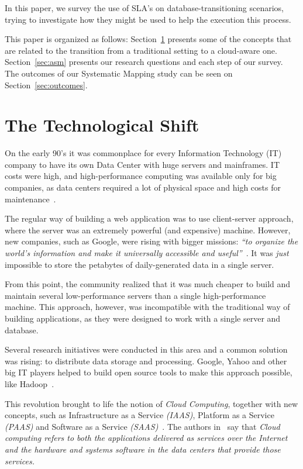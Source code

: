 \documentclass{article}
\begin{document}
In this paper, we survey the use of SLA's on database-transitioning scenarios, trying to investigate how they might be used to help the execution this process.
\bigskip

This paper is organized as follows: 
Section~\ref{sec:tts} presents some of the concepts that are related to the transition from a traditional setting to a cloud-aware one.
Section~\ref{sec:asm} presents our research questions and each step of our survey. The outcomes of our Systematic Mapping study can be seen on Section~\ref{sec:outcomes}.

\section{The Technological Shift}
\label{sec:tts}


On the early 90's it was commonplace for every Information Technology (IT) company to have its own Data Center with huge servers and mainframes. 
IT costs were high, and high-performance computing was available only for big companies, as data centers required a lot of physical space and high costs for maintenance~\cite{Armbrust09m.:above}.

The regular way of building a web application was to use client-server approach, where the server was an extremely powerful (and expensive) machine. 
However, new companies, such as Google, were rising with bigger missions: \textit{``to organize the world's information and make it universally accessible and useful''}~\cite{Spector:2012:GHA:2209249.2209262}. 
It was \textit{just} impossible to store the petabytes of daily-generated data in a single server. 

From this point, the community realized that it was much cheaper to build and maintain several low-performance servers than a single high-performance machine.
This approach, however, was incompatible with the traditional way of building applications, as they were designed to work with a single server and database. 

Several research initiatives were conducted in this area and a common solution was rising: to distribute data storage and processing. 
Google, Yahoo and other big IT players helped to build open source tools to make this approach possible, like Hadoop~\cite{5496972}.

This revolution brought to life the notion of \textit{Cloud Computing}, together with new concepts, such as Infrastructure as a Service \textit{(IAAS)}, Platform as a Service \textit{(PAAS)} and Software as a Service \textit{(SAAS)}~\cite{AViewOfCloudComputing}.
The authors in~\cite{AViewOfCloudComputing} say that \textit{Cloud computing refers to both the applications delivered as services over the Internet and the hardware and systems software in the data centers that provide those services.} 
\end{document}
